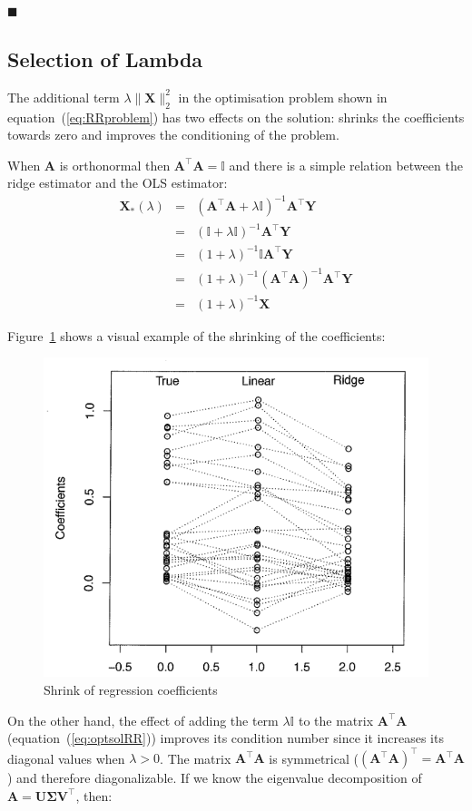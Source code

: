 $\blacksquare$

\subsection{Selection of Lambda}

The additional term $\lambda \|\mathbf{\mathbf{X}}\|_2^2$ in the optimisation
problem shown in equation~(\ref{eq:RRproblem}) has two effects on the solution:
shrinks the coefficients towards zero and improves the conditioning of the
problem.

When $\mathbf{A}$ is orthonormal then $\mathbf{A}^\top \mathbf{A} =\mathbb{I}$ and there is a simple relation between the ridge estimator and the OLS estimator:
\begin{eqnarray*}
\mathbf{X}_* (\lambda) &=& (\mathbf{A}^\top \mathbf{A}+\lambda \mathbb{I})^{-1}\mathbf{A}^\top \mathbf{Y} \\
 &=& (\mathbb{I} + \lambda \mathbb{I})^{-1} \mathbf{A}^\top \mathbf{Y} \\
 &=&(1+\lambda)^{-1} \mathbb{I} \mathbf{A}^\top \mathbf{Y} \\
 &=&(1+\lambda)^{-1} (\mathbf{A}^\top \mathbf{A})^{-1}\mathbf{A}^\top \mathbf{Y} \\
 &=&(1+\lambda)^{-1} \mathbf{X}
\end{eqnarray*}

Figure~\ref{fig:shrinks} shows a visual example of the shrinking of the
coefficients:

\begin{figure}[h!]
\includegraphics[width=0.5\linewidth]{img/shrinks}
\caption{Shrink of regression coefficients}
\label{fig:shrinks}
\end{figure}



On the other hand, the effect of adding the term $\lambda \mathbb{I}$
to the matrix $\mathbf{A}^\top \mathbf{A}$
(equation~(\ref{eq:optsolRR})) improves its condition number since it
increases its diagonal values when $\lambda > 0 $.  The matrix
$\mathbf{A}^\top \mathbf{A}$ is symmetrical ($(\mathbf{A}^\top
\mathbf{A})^\top = \mathbf{A}^\top \mathbf{A}$) and therefore
diagonalizable.  If we know the eigenvalue decomposition of $\mathbf{A}
= \mathbf{U\Sigma V^\top}$, then:

